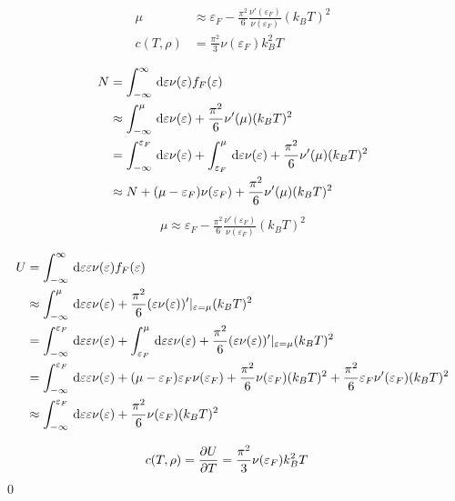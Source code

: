 \documentclass[uplatex,diffipdfmx,a4paper,11pt]{jlreq}
\makeatletter
\numberwithin{equation}{section}
\theoremstyle{definition}
\renewenvironment{proof}[1][\proofname]{\par
  \normalfont
  \topsep6\p@\@plus6\p@ \trivlist
  \item[\hskip\labelsep{\bfseries #1}\@addpunct{\bfseries}]\ignorespaces\quad\par
}{%
  \qed\endtrivlist\@endpefalse
}
\renewcommand\proofname{証明}
\makeatother
\begin{document}
\begin{theorem}
  \begin{align}
    \mu        & \approx \varepsilon_F - \frac{\pi^2}{6}\frac{\nu'(\varepsilon_F)}{\nu(\varepsilon_F)}(k_BT)^2 \\
    c(T, \rho) & = \frac{\pi^2}{3}\nu(\varepsilon_F)k_B^2T
  \end{align}
\end{theorem}
\begin{proof}
  \begin{align}
    N & = \int_{-\infty}^{\infty}\dl{\varepsilon}\nu(\varepsilon)f_F(\varepsilon)                                                                                        \\
      & \approx \int_{-\infty}^{\mu}\dl{\varepsilon}\nu(\varepsilon) + \frac{\pi^2}{6}\nu'(\mu)(k_BT)^2                                                                  \\
      & = \int_{-\infty}^{\varepsilon_F}\dl{\varepsilon}\nu(\varepsilon) + \int_{\varepsilon_F}^{\mu}\dl{\varepsilon}\nu(\varepsilon) + \frac{\pi^2}{6}\nu'(\mu)(k_BT)^2 \\
      & \approx N + (\mu - \varepsilon_F)\nu(\varepsilon_F) + \frac{\pi^2}{6}\nu'(\mu)(k_BT)^2
  \end{align}
  \begin{align}
    \mu \approx \varepsilon_F - \frac{\pi^2}{6}\frac{\nu'(\varepsilon_F)}{\nu(\varepsilon_F)}(k_BT)^2
  \end{align}


  \begin{align}
    U & = \int_{-\infty}^{\infty}\dl{\varepsilon}\varepsilon\nu(\varepsilon)f_F(\varepsilon)                                                                                                                                                     \\
      & \approx \int_{-\infty}^\mu\dl{\varepsilon}\varepsilon\nu(\varepsilon) + \frac{\pi^2}{6}(\varepsilon\nu(\varepsilon))'|_{\varepsilon = \mu}(k_BT)^2                                                                                       \\
      & = \int_{-\infty}^{\varepsilon_F}\dl{\varepsilon}\varepsilon\nu(\varepsilon) + \int_{\varepsilon_F}^\mu\dl{\varepsilon}\varepsilon\nu(\varepsilon) + \frac{\pi^2}{6}(\varepsilon\nu(\varepsilon))'|_{\varepsilon = \mu}(k_BT)^2           \\
      & = \int_{-\infty}^{\varepsilon_F}\dl{\varepsilon}\varepsilon\nu(\varepsilon) + (\mu - \varepsilon_F)\varepsilon_F\nu(\varepsilon_F) + \frac{\pi^2}{6}\nu(\varepsilon_F)(k_BT)^2 + \frac{\pi^2}{6}\varepsilon_F\nu'(\varepsilon_F)(k_BT)^2 \\
      & \approx \int_{-\infty}^{\varepsilon_F}\dl{\varepsilon}\varepsilon\nu(\varepsilon) + \frac{\pi^2}{6}\nu(\varepsilon_F)(k_BT)^2
  \end{align}

  \begin{align}
    c(T, \rho) & = \diffp{U}{T} = \frac{\pi^2}{3}\nu(\varepsilon_F)k_B^2T
  \end{align}
\end{proof}
\end{document}
